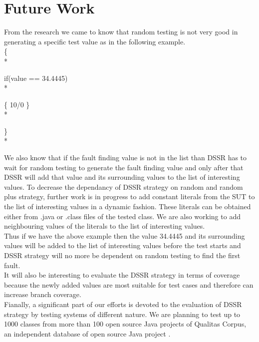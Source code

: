 \section{Future Work}

From the research we came to know that random testing is not very good in generating a specific test value as in the following example.  \\

\{ \\*   

\hspace{07 mm}if(value == 34.4445) \\*

\hspace{07 mm}\{ 10/0 \} \\* 

\} \\*


We also know that if the fault finding value is not in the list than DSSR has to wait for random testing to generate the fault finding value and only after that DSSR will add that value and its surrounding values to the list of interesting values. To decrease the dependancy of DSSR strategy on random and random plus strategy, further work is in progress to add constant literals from the SUT to the list of interesting values in a dynamic fashion. These literals can be obtained either from .java or .class files of the tested class. We are also working to add  neighbouring values of the literals to the list of interesting values. \\

Thus if we have the above example then the value 34.4445 and its surrounding values will be added to the list of interesting values before the test starts and DSSR strategy will no more be dependent on random testing to find the first fault.\\

It will also be interesting to evaluate the DSSR strategy in terms of coverage because the newly added values are most suitable for test cases and therefore can increase branch coverage. \\

Fianally, a significant part of our efforts is devoted to the evaluation of DSSR strategy by testing systems of different nature. We are planning to test up to 1000 classes from more than 100 open source Java projects of Qualitas Corpus, an independent database of open source Java project \cite{Tempero2010}. \\
